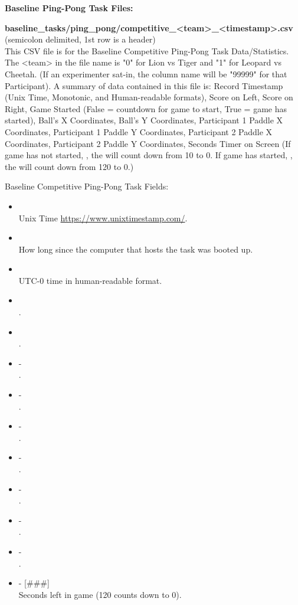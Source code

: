 \begin{description}
\bigskip\item\textbf{Baseline Ping-Pong Task Files:}
\medskip
\item\textbf{baseline\_tasks/ping\_pong/competitive\_<team>\_<timestamp>.csv}\\(semicolon delimited, 1st row is a header)\\
This CSV file is for the Baseline Competitive Ping-Pong Task Data/Statistics. The <team> in the file name is "0" for Lion vs Tiger and "1" for Leopard vs Cheetah. (If an experimenter sat-in, the column name will be "99999" for that Participant). A summary of data contained in this file is: Record Timestamp (Unix Time, Monotonic, and Human-readable formats), Score on Left, Score on Right, Game Started (False = countdown for game to start, True = game has started), Ball's X Coordinates, Ball's Y Coordinates, Participant 1 Paddle X Coordinates, Participant 1 Paddle Y Coordinates, Participant 2 Paddle X Coordinates, Participant 2 Paddle Y Coordinates, Seconds Timer on Screen (If game has not started, , the  will count down from 10 to 0. If game has started, , the  will count down from 120 to 0.)

Baseline Competitive Ping-Pong Task Fields:
\begin{itemize}
    \item {}\\Unix Time \href{https://www.unixtimestamp.com/}{https://www.unixtimestamp.com/}.
    \item {}\\How long since the computer that hosts the task was booted up.
    \item {}\\ UTC-0 time in human-readable format.
    \item {}\\.
    \item {}\\.
    \item {} - \\.
    \item {} - \\.
    \item {} - \\.
    \item {} -\\.
    \item {} -\\.
    \item {} -\\.
    \item {} -\\.
    \item {} - [\#\#\#]\\Seconds left in game (120 counts down to 0).
\end{itemize}




\end{description}
